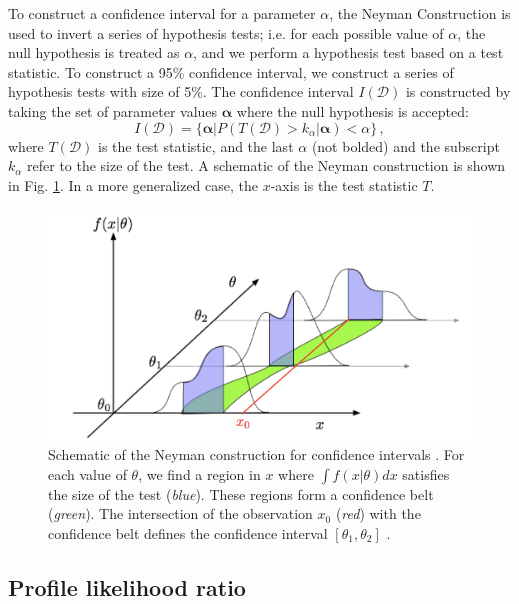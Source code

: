To construct a confidence interval for a parameter $\alpha$, the Neyman Construction is used to invert a series of hypothesis tests; i.e. for each possible value of $\alpha$, the null hypothesis is treated as $\alpha$, and we perform a hypothesis test based on a test statistic. To construct a 95\% confidence interval, we construct a series of hypothesis tests with size of 5\%. The confidence interval $I(\mathcal{D})$ is constructed by taking the set of parameter values $\boldsymbol{\alpha}$ where the null hypothesis is accepted:
\begin{equation}
    I(\mathcal{D}) = \{ \boldsymbol{\alpha} | P(T(\mathcal{D}) > k_\alpha | \boldsymbol{\alpha}) < \alpha \} \, ,
\end{equation} 
where $T(\mathcal{D})$ is the test statistic, and the last $\alpha$ (not bolded) and the subscript $k_\alpha$ refer to the size of the test. A schematic of the Neyman construction is shown in Fig. \ref{fig:neyman-construction}. In a more generalized case, the $x$-axis is the test statistic $T$.

\begin{figure}[ht]
    \centering
    \includegraphics[width=12cm]{figures/ch-9-event-categorization-and-signal-extraction/schematic_neyman_construction.png}
    \caption[Schematic of the Neyman construction for confidence intervals.]{Schematic of the Neyman construction for confidence intervals \cite{2011-Statistics-Cranmer}. For each value of $\theta$, we find a region in $x$ where $\int f(x|\theta) dx$ satisfies the size of the test (\textit{blue}). These regions form a confidence belt (\textit{green}). The intersection of the observation $x_0$ (\textit{red}) with the confidence belt defines the confidence interval $[\theta_1, \theta_2]$ \cite{2011-Statistics-Cranmer}.} 
    \label{fig:neyman-construction}
\end{figure}

\subsection{Profile likelihood ratio}

